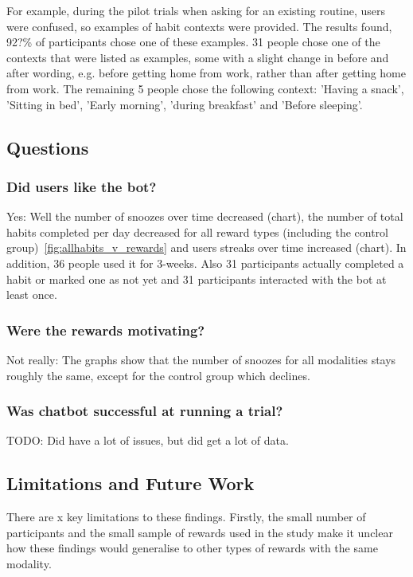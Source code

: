 \documentclass{scaffold/sigchi}
\begin{document}
For example, during the pilot trials when asking for an existing routine, users were confused, so examples of habit contexts were provided. The results found, 92?\% of participants chose one of these examples.
31 people chose one of the contexts that were listed as examples, some with a slight change in before and after wording, e.g. before getting home from work, rather than after getting home from work. The remaining 5 people chose the following context: 'Having a snack', 'Sitting in bed', 'Early morning', 'during breakfast' and 'Before sleeping'.



\subsection{Questions}
\subsubsection{Did users like the bot?}
Yes: Well the number of snoozes over time decreased (chart), the number of total habits completed per day decreased for all reward types (including the control group)~\ref{fig:allhabits_v_rewards} and users streaks over time increased (chart). In addition, 36 people used it for 3-weeks. Also 31 participants actually completed a habit or marked one as not yet and 31 participants interacted with the bot at least once.




\subsubsection{Were the rewards motivating?}
Not really: The graphs show that the number of snoozes for all modalities stays roughly the same, except for the control group which declines.


\subsubsection{Was chatbot successful at running a trial?}
TODO: Did have a lot of issues, but did get a lot of data.


\subsection{Limitations and Future Work}
There are x key limitations to these findings. Firstly, the small number of participants and the small sample of rewards used in the study make it unclear how these findings would generalise to other types of rewards with the same modality.
\end{document}
